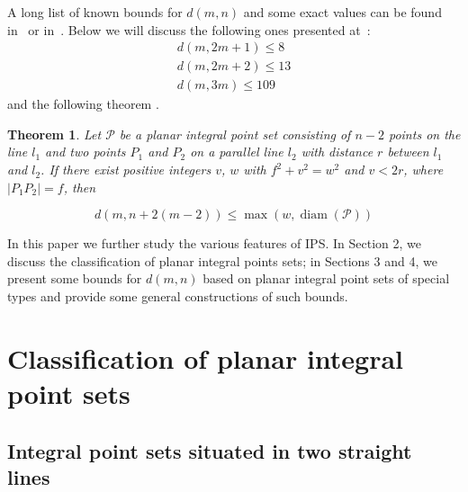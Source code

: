 \documentclass[12pt]{article}
\theoremstyle{theorem}
\newtheorem{theorem}{Theorem}
\theoremstyle{dfn}
\newtheorem{dfn}{Definition}
\theoremstyle{remark}
\begin{document}

A long list of known bounds for $d(m, n)$ and some exact values
can be found in~\cite[Theorem 1]{kurz2008bounds} or in~\cite{our-vmmsh-2018}.
Below we will discuss the following ones presented at~\cite{kurz2008bounds}:
\begin{align}
	d(m, 2m + 1) \leq 8\\
	d(m, 2m + 2) \leq 13 \label{eq:d_m_2m+2}\\
	d(m, 3m) \leq 109
\end{align}
and the following theorem \cite[Theorem 2.1]{kurz2008bounds}.

\begin{theorem}
	\label{thm:Kurz_blowup}
	Let $\mathcal{P}$ be a planar integral point set consisting of
	$n - 2$ points on the line $l_1$ and two points $P_{1}$ and $P_{2}$ on a
	parallel line $l_2$ with distance $r$ between $l_{1}$ and $l_{2}$. If there
	exist positive integers $v$, $w$ with $f^{2} + v^{2}
	= w^{2}$ and $v < 2r$, where $|P_{1}P_{2}| = f$,
	then

	\begin{equation}\label{formula1}
		d(m, n + 2(m - 2)) \leq \max(w, \operatorname{diam}(\mathcal{P}))
	\end{equation}

\end{theorem}

In this paper we further study the various features of IPS.
In Section 2, we discuss the classification of planar integral points sets;
in Sections 3 and 4, we present some bounds for $d(m,n)$ based on planar integral point sets of special types
and provide some general constructions of such bounds.

\section{Classification of planar integral point sets}

\subsection{Integral point sets situated in two straight lines}
\end{document}
